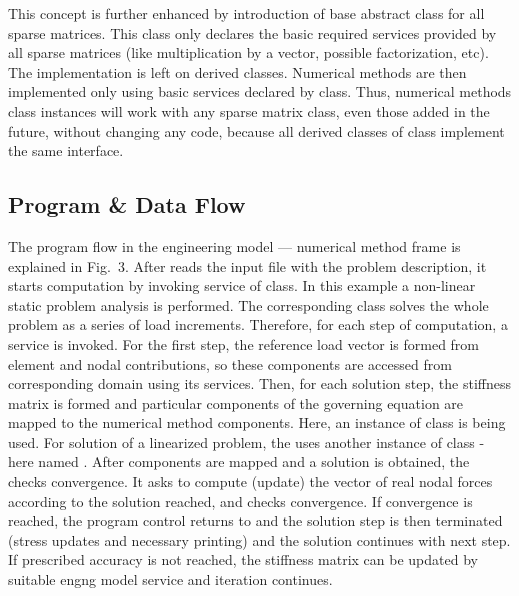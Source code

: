 \begin{htmlonly}
\begin{center}
This concept is further enhanced by introduction of base abstract
class for all sparse matrices. This class only declares the basic
required services provided by all sparse matrices (like multiplication
by a vector, possible factorization, etc). The implementation is left on
derived classes.  Numerical methods are then implemented only
using basic services declared by  class. Thus, numerical
methods class instances will work with any sparse matrix class, even
those added in the future, without changing any code, because all derived
classes of  class implement the same interface.

\subsection {Program \& Data Flow}
The program flow in the engineering model --- numerical method frame is 
explained in Fig.~3. After  reads the input file with
the problem description,
it starts computation by invoking  service of  class. In this example a non-linear static problem
analysis is performed. The corresponding  class solves the whole problem
as a series of load increments. Therefore, for each step of computation,
a  service is invoked. For the first step, the reference
load vector is formed from element and nodal contributions, so these
components are accessed from corresponding domain using its
services. Then, for each solution step,  the stiffness matrix is formed
and particular components of the governing equation are mapped to
the numerical method components. Here, an  instance of  class is being used. For solution of a linearized problem, the
 uses another instance of  class - here named
. After components are mapped and a solution is obtained,
the  checks convergence. It asks  to compute
(update) the vector of real nodal forces according to the solution reached,
and checks convergence. If convergence is reached, the program control
returns to  and the solution step is then terminated (stress
updates and necessary printing) and the solution continues with next
step. If prescribed accuracy is not reached, the stiffness matrix can be
updated by suitable engng model service and iteration continues. 


\end{center}
\end{htmlonly}
